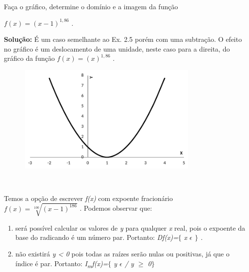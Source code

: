 \begin{texemplo}
	
Faça o gráfico, determine o domínio e a imagem da função

\quad \quad   \( f \left( x \right) = \left( x-1 \right) ^{1,86} \) .

\textbf{Solução:} É um caso semelhante ao Ex. 2.5 porém com uma subtração. O efeito no gráfico é um deslocamento de uma unidade, neste caso para a direita, do gráfico da função  \( f \left( x \right) = \left( x \right) ^{1,86} \) .

\begin{figure}[H]
	\begin{Center}
		\includegraphics[width=3.57in,height=2.1in]{capitulos/outras_funcoes/media/image9.pdf}
	\end{Center}
\end{figure}

~~

Temos a opção de escrever \textit{f(x)} com expoente fracionário  \( f \left( x \right) =\sqrt[100]{ \left( x-1 \right) ^{186}} \) . Podemos observar que: 

\begin{enumerate}
	\item será possível calcular os valores de \textit{y} para qualquer  \textit{x } real, pois o expoente da base do radicando é um número par. Portanto: \textit{Df(x)=$ \{ $  x $ \epsilon $  \textbf{ }$ \} $ .}

	\item não existirá \textit{y < 0} pois todas as raízes serão nulas ou positivas, já que o índice é par. Portanto: \textit{I\textsubscript{m}f(x)=$ \{ $ y $ \epsilon $   / y $ \geq $  0$ \} $  }\qedsymbol{} 
\end{enumerate}
\end{texemplo}

